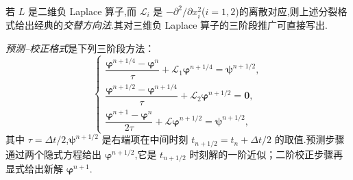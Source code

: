 若 \(L\) 是二维负 Laplace 算子,而 \(\mathcal L_i\) 是 \(-\partial^2/\partial x_i^2\)(\(i=1,2\))的离散对应,则上述分裂格式给出经典的\emph{交替方向法}.其对三维负 Laplace 算子的三阶段推广可直接写出.

\emph{预测--校正格式}是下列三阶段方法：
\begin{equation}\label{eq:5.7.6}
  \begin{cases}
    \dfrac{\boldsymbol{\varphi}^{n+1/4}-\boldsymbol{\varphi}^n}{\tau}
      +\mathcal L_1\boldsymbol{\varphi}^{n+1/4}=\boldsymbol{\psi}^{n+1/2},\\[4pt]
    \dfrac{\boldsymbol{\varphi}^{n+1/2}-\boldsymbol{\varphi}^{n+1/4}}{\tau}
      +\mathcal L_2\boldsymbol{\varphi}^{n+1/2}=\boldsymbol{0},\\[4pt]
    \dfrac{\boldsymbol{\varphi}^{n+1}-\boldsymbol{\varphi}^n}{2\tau}
      +\mathcal L\boldsymbol{\varphi}^{n+1/2}=\boldsymbol{\psi}^{n+1/2},
  \end{cases}
\end{equation}
其中 \(\tau=\Delta t/2\),\(\boldsymbol{\psi}^{n+1/2}\) 是右端项在中间时刻 \(t_{n+1/2}=t_n+\Delta t/2\) 的取值.预测步骤通过两个隐式方程给出 \(\boldsymbol{\varphi}^{n+1/2}\),它是 \(t_{n+1/2}\) 时刻解的一阶近似；二阶校正步骤再显式给出新解 \(\boldsymbol{\varphi}^{n+1}\).

